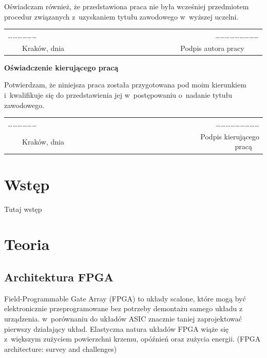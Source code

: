 \documentclass[12pt, oneside, a4paper]{article}
\begin{document}
\noindent Oświadczam również, że przedstawiona praca nie była wcześniej przedmiotem procedur związanych z~uzyskaniem tytułu zawodowego w~wyższej uczelni.
\vspace{2cm}
\begin{center}
\begin{tabular}{lr}
\ldots\ldots\ldots\ldots\ldots\ldots~~~~~~~~~~~~~~~~~~~~~~~~~~~~~~~~~~~~~~&
\ldots\ldots\ldots\ldots\ldots\ldots\ldots\ldots\ldots \\
{~~~~Kraków, dnia} & {Podpis autora pracy~~~~}
\end{tabular}
\end{center}
\vspace{5cm}
\begin{flushleft}
\large \textbf{Oświadczenie kierującego pracą}
\end{flushleft}

\noindent Potwierdzam, że niniejsza praca została przygotowana pod moim kierunkiem i~kwalifikuje się do przedstawienia jej w~postępowaniu o~nadanie tytułu zawodowego.
\vspace{2cm}
\begin{center}
\begin{tabular}{lr}
\ldots\ldots\ldots\ldots\ldots\ldots~~~~~~~~~~~~~~~~~~~~~~~~~~~~~~~~~~~~~~&
\ldots\ldots\ldots\ldots\ldots\ldots\ldots\ldots\ldots \\
{~~~~Kraków, dnia} & {Podpis kierującego pracą~~}
\end{tabular}
\end{center}
\vfill

\newpage
\tableofcontents

\newpage
\section{Wstęp}
Tutaj wstęp

\newpage
\section{Teoria}
\subsection{Architektura FPGA}
Field-Programmable Gate Array (FPGA) to układy scalone, które mogą być
elektronicznie przeprogramowane bez potrzeby demontażu samego układu
z urządzenia. w~porównaniu do układów ASIC znacznie taniej zaprojektować
pierwszy działający układ. Elastyczna natura układów FPGA wiąże się z~większym
zużyciem powierzchni krzemu, opóźnień oraz zużycia energii.
 (FPGA architecture: survey and challenges)
\end{document}
